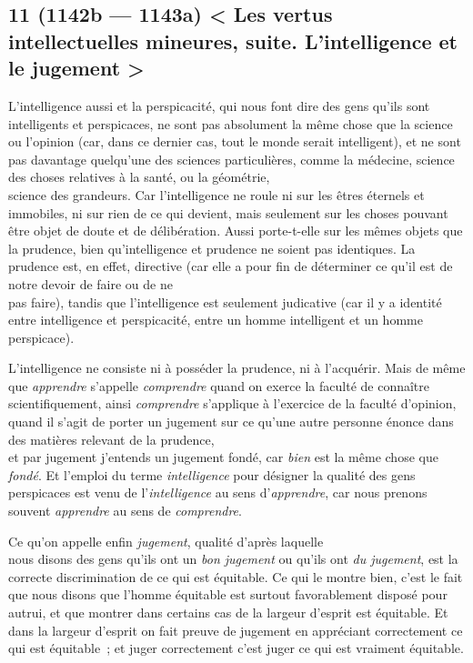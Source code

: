 \documentclass[french,twoside]{book} %
\begin{document}
\subsection[{11 (1142b — 1143a) < Les vertus intellectuelles mineures, suite. L’intelligence et le jugement >}]{11 (1142b — 1143a) < Les vertus intellectuelles mineures, suite. L’intelligence et le jugement >}
\noindent L’intelligence aussi et la perspicacité, qui nous font dire  des gens qu’ils sont intelligents et perspicaces, ne sont pas absolument la même chose que la science ou l’opinion (car, dans ce dernier cas, tout le monde serait intelligent), et ne sont pas davantage quelqu’une des sciences particulières, comme la médecine, science des choses relatives à la santé, ou la géométrie, \\
science des grandeurs. Car l’intelligence ne roule ni sur les êtres éternels et immobiles, ni sur rien de ce qui devient, mais seulement sur les choses pouvant être objet de doute et de délibération. Aussi porte-t-elle sur les mêmes objets que la prudence, bien qu’intelligence et prudence ne soient pas identiques. La prudence est, en effet, directive (car elle a pour fin de déterminer ce qu’il est de notre devoir de faire ou de ne \\
pas faire), tandis que l’intelligence est seulement judicative (car il y a identité entre intelligence et perspicacité, entre un homme intelligent et un homme perspicace).\par
L’intelligence ne consiste ni à posséder la prudence, ni à l’acquérir. Mais de même que {\itshape apprendre} s’appelle {\itshape comprendre} quand on exerce la faculté de connaître scientifiquement, ainsi {\itshape comprendre} s’applique à l’exercice de la faculté d’opinion, quand il s’agit de porter un jugement sur ce qu’une autre personne énonce dans des matières relevant de la prudence, \\
et par jugement j’entends un jugement fondé, car {\itshape bien} est la même chose que {\itshape fondé}. Et l’emploi du terme {\itshape intelligence} pour désigner la qualité des gens perspicaces est venu de l’{\itshape intelligence} au sens d’{\itshape apprendre}, car nous prenons souvent {\itshape apprendre} au sens de {\itshape comprendre}.\par
Ce qu’on appelle enfin {\itshape jugement}, qualité d’après laquelle \\
nous disons des gens qu’ils ont un {\itshape bon jugement} ou qu’ils ont {\itshape du jugement}, est la correcte discrimination de ce qui est équitable. Ce qui le montre bien, c’est le fait que nous disons que l’homme équitable est surtout favorablement disposé pour autrui, et que montrer dans certains cas de la largeur d’esprit est équitable. Et dans la largeur d’esprit on fait preuve de jugement en appréciant correctement ce qui est équitable ; et juger correctement c’est juger ce qui est vraiment équitable.
\end{document}
